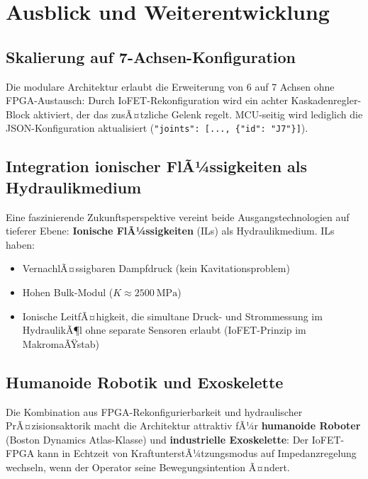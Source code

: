 ﻿\documentclass[a4paper,12pt]{scrreprt}
\theoremstyle{definition}
\begin{document}
\section{Ausblick und Weiterentwicklung}

\subsection{Skalierung auf 7-Achsen-Konfiguration}

Die modulare Architektur erlaubt die Erweiterung von 6 auf 7 Achsen
ohne FPGA-Austausch: Durch IoFET-Rekonfiguration wird ein achter
Kaskadenregler-Block aktiviert, der das zusÃ¤tzliche Gelenk regelt.
MCU-seitig wird lediglich die JSON-Konfiguration aktualisiert
(\texttt{"joints": [..., \{"id": "J7"\}]}).

\subsection{Integration ionischer FlÃ¼ssigkeiten als Hydraulikmedium}

Eine faszinierende Zukunftsperspektive vereint beide Ausgangstechnologien
auf tieferer Ebene: \textbf{Ionische FlÃ¼ssigkeiten} (ILs) als
Hydraulikmedium. ILs haben:
\begin{itemize}
  \item VernachlÃ¤ssigbaren Dampfdruck (kein Kavitationsproblem)
  \item Hohen Bulk-Modul ($K \approx \SI{2500}{\mega\pascal}$)
  \item Ionische LeitfÃ¤higkeit, die simultane Druck- und Strommessung
        im HydraulikÃ¶l ohne separate Sensoren erlaubt (IoFET-Prinzip
        im MakromaÃŸstab)
\end{itemize}

\subsection{Humanoide Robotik und Exoskelette}

Die Kombination aus FPGA-Rekonfigurierbarkeit und hydraulischer
PrÃ¤zisionsaktorik macht die Architektur attraktiv fÃ¼r
\textbf{humanoide Roboter} (Boston Dynamics Atlas-Klasse) und
\textbf{industrielle Exoskelette}: Der IoFET-FPGA kann in Echtzeit
von KraftunterstÃ¼tzungsmodus auf Impedanzregelung wechseln, wenn
der Operator seine Bewegungsintention Ã¤ndert.
\end{document}
